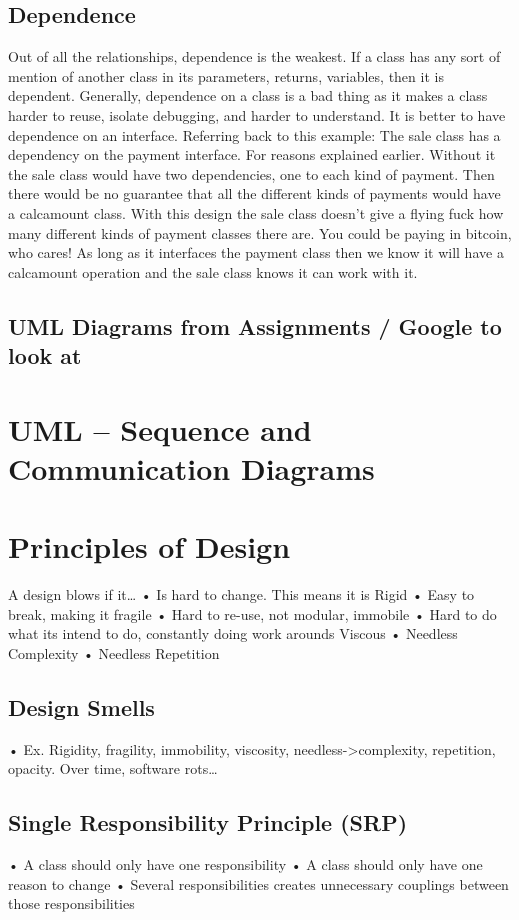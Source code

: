 \documentclass[11pt]{article}
\begin{document}
{\subsection{Dependence}
Out of all the relationships, dependence is the weakest. If a class has any sort of mention of another class
in its parameters, returns, variables, then it is dependent.
Generally, dependence on a class is a bad thing as it makes a class harder to reuse, isolate debugging, and
harder to understand. It is better to have dependence on an interface.
Referring back to this example: The sale class has a dependency on the payment interface. For reasons
explained earlier. Without it the sale class would have two dependencies, one to each kind of payment. Then
there would be no guarantee that all the different kinds of payments would have a calcamount class.
With this design the sale class doesn't give a flying fuck how many different kinds of payment classes there
are. You could be paying in bitcoin, who cares! As long as it interfaces the payment class then we know it will
have a calcamount operation and the sale class knows it can work with it. 
\subsection{UML Diagrams from Assignments / Google to look at}
\section{UML -- Sequence and Communication Diagrams}

\section{Principles of Design}
A design blows if it…
• Is hard to change. This means it is Rigid
• Easy to break, making it fragile
• Hard to re-use, not modular, immobile
• Hard to do what its intend to do, constantly doing work arounds Viscous
• Needless Complexity
• Needless Repetition
\subsection{Design Smells}
• Ex. Rigidity, fragility, immobility, viscosity, needless->complexity, repetition, opacity. Over time, software rots…
\subsection{Single Responsibility Principle (SRP)}
• A class should only have one responsibility
• A class should only have one reason to change
• Several responsibilities creates unnecessary couplings between those responsibilities
}
\end{document}
